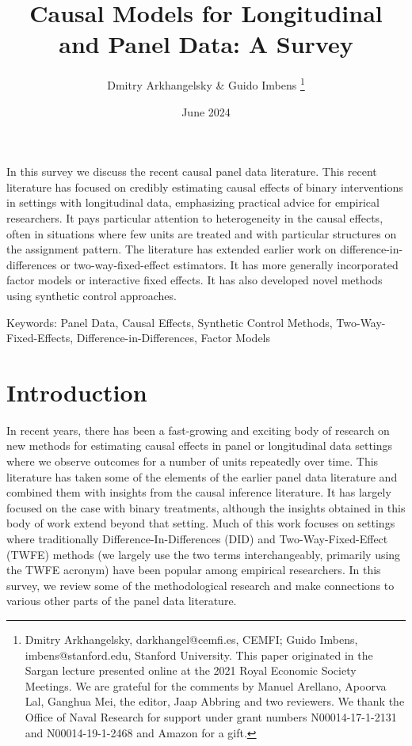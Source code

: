 \documentclass[letterpaper,12pt,leqno]{article}
\begin{document}
\title{Causal Models for Longitudinal and Panel Data: A Survey}
\author{Dmitry Arkhangelsky \& Guido Imbens
\thanks{Dmitry Arkhangelsky, darkhangel@cemfi.es,  CEMFI; Guido Imbens, imbens@stanford.edu, Stanford University.
This paper originated in the Sargan lecture presented online at the 2021 Royal Economic Society Meetings. We are grateful for the comments by Manuel Arellano, Apoorva Lal, Ganghua Mei, the editor, Jaap Abbring and two reviewers. We thank the Office of Naval Research for support under grant numbers N00014-17-1-2131 and N00014-19-1-2468 and Amazon for a gift.}}
\date{June 2024}                       
\begin{titlepage}
\maketitle
 In this survey we discuss the recent causal panel data literature. This recent literature has focused on credibly estimating causal effects of binary interventions in settings with longitudinal data, emphasizing practical advice for empirical researchers. It pays particular attention to heterogeneity in the causal effects, often in situations where few units are treated and with particular structures on the assignment pattern. The literature has extended earlier work on difference-in-differences or two-way-fixed-effect estimators. It has more generally incorporated factor models or interactive fixed effects. It has also developed novel methods using synthetic control approaches.

\vskip0.7cm

Keywords: Panel Data, Causal Effects, Synthetic Control Methods, Two-Way-Fixed-Effects, Difference-in-Differences, Factor Models
\end{titlepage}



\section{Introduction}



In recent years, there has been a fast-growing and exciting body of research on new methods for estimating causal effects in panel or longitudinal data settings where we observe outcomes for a number of units repeatedly over time. This literature has taken some of the elements of the earlier panel data literature and combined them with insights from the causal inference literature. It has largely focused on the case with binary treatments, although the insights obtained in this body of work extend beyond that setting. Much of this work focuses on settings where traditionally Difference-In-Differences (DID) and Two-Way-Fixed-Effect (TWFE) methods (we largely use the two terms interchangeably, primarily using the TWFE acronym) have been popular among empirical researchers. In this survey, we review some of the methodological research and make connections to various other parts of the panel data literature. 
\end{document}
